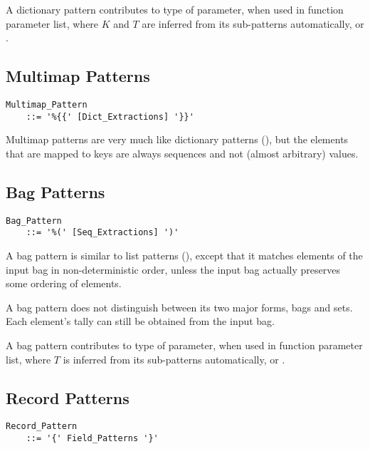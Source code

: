 A dictionary pattern contributes  to type of parameter, when used in function parameter list, where $K$ and $T$ are inferred from its sub-patterns automatically, or . 





\subsection{Multimap Patterns}
\label{sec:multimap-patterns}

\grammar\begin{lstlisting}
Multimap_Pattern 
    ::= '%{{' [Dict_Extractions] '}}'
\end{lstlisting}

Multimap patterns are very much like dictionary patterns (), but the elements that are mapped to keys are always sequences and not (almost arbitrary) values. 





\subsection{Bag Patterns}
\label{sec:bag-patterns}

\grammar\begin{lstlisting}
Bag_Pattern 
    ::= '%(' [Seq_Extractions] ')'
\end{lstlisting}

A bag pattern is similar to list patterns (), except that it matches elements of the input bag in non-deterministic order, unless the input bag actually preserves some ordering of elements. 

A bag pattern does not distinguish between its two major forms, bags and sets. Each element's tally can still be obtained from the input bag. 

A bag pattern contributes  to type of parameter, when used in function parameter list, where $T$ is inferred from its sub-patterns automatically, or . 





\subsection{Record Patterns}
\label{sec:record-patterns}

\grammar\begin{lstlisting}
Record_Pattern 
    ::= '{' Field_Patterns '}'
\end{lstlisting}


